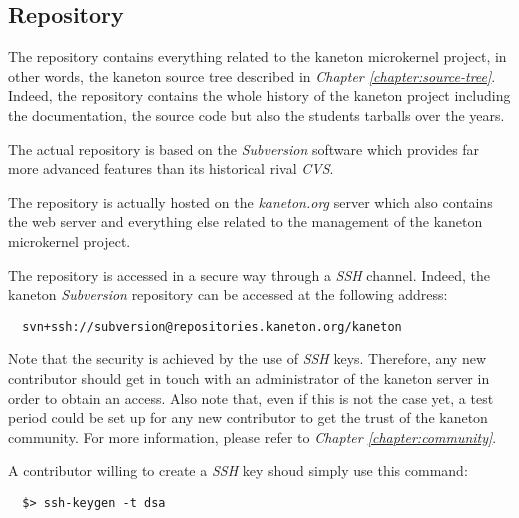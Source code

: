 %
%
%
%
%
%

%
%

\subsection{Repository}
\label{section:repository}

The repository contains everything related to the kaneton microkernel
project, in other words, the kaneton source tree described in
\textit{Chapter \ref{chapter:source-tree}}. Indeed, the repository contains
the whole history of the kaneton project including the documentation, the
source code but also the students tarballs over the years.

The actual repository is based on the \textit{Subversion} software which
provides far more advanced features than its historical rival \textit{CVS}.

The repository is actually hosted on the \textit{kaneton.org} server which
also contains the web server and everything else related to the management
of the kaneton microkernel project.

The repository is accessed in a secure way through a \textit{SSH} channel.
Indeed, the kaneton \textit{Subversion} repository can be accessed at the
following address:

\begin{verbatim}
  svn+ssh://subversion@repositories.kaneton.org/kaneton
\end{verbatim}

Note that the security is achieved by the use of \textit{SSH} keys. Therefore,
any new contributor should get in touch with an administrator of the
kaneton server in order to obtain an access. Also note that, even if this is
not the case yet, a test period could be set up for any new contributor
to get the trust of the kaneton community. For more information, please
refer to \textit{Chapter \ref{chapter:community}}.

A contributor willing to create a \textit{SSH} key shoud simply use this
command:

\begin{verbatim}
  $> ssh-keygen -t dsa
\end{verbatim}

